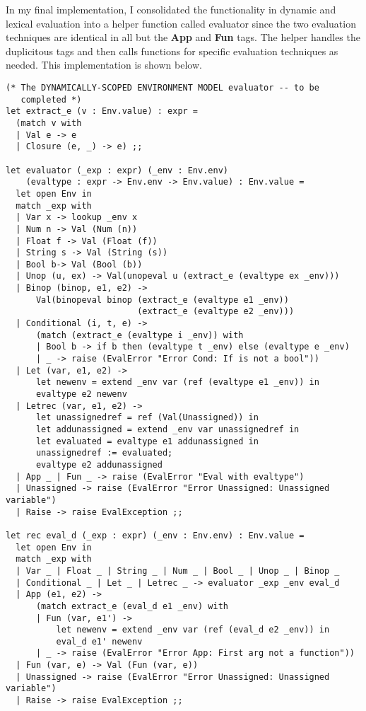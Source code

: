 \documentclass[12pt]{article}
\theoremstyle{definition}
\begin{document}
In my final implementation, I consolidated the functionality in dynamic and lexical evaluation into a helper function called evaluator since the two evaluation techniques are identical in all but the \textbf{App} and \textbf{Fun} tags. The helper handles the duplicitous tags and then calls functions for specific evaluation techniques as needed. This implementation is shown below. 


\begin{verbatim}
(* The DYNAMICALLY-SCOPED ENVIRONMENT MODEL evaluator -- to be
   completed *)
let extract_e (v : Env.value) : expr = 
  (match v with 
  | Val e -> e 
  | Closure (e, _) -> e) ;;

let evaluator (_exp : expr) (_env : Env.env) 
    (evaltype : expr -> Env.env -> Env.value) : Env.value =
  let open Env in 
  match _exp with 
  | Var x -> lookup _env x
  | Num n -> Val (Num (n))
  | Float f -> Val (Float (f))
  | String s -> Val (String (s))
  | Bool b-> Val (Bool (b))
  | Unop (u, ex) -> Val(unopeval u (extract_e (evaltype ex _env)))
  | Binop (binop, e1, e2) -> 
      Val(binopeval binop (extract_e (evaltype e1 _env)) 
                          (extract_e (evaltype e2 _env)))
  | Conditional (i, t, e) -> 
      (match (extract_e (evaltype i _env)) with
      | Bool b -> if b then (evaltype t _env) else (evaltype e _env)
      | _ -> raise (EvalError "Error Cond: If is not a bool"))
  | Let (var, e1, e2) -> 
      let newenv = extend _env var (ref (evaltype e1 _env)) in 
      evaltype e2 newenv
  | Letrec (var, e1, e2) -> 
      let unassignedref = ref (Val(Unassigned)) in 
      let addunassigned = extend _env var unassignedref in 
      let evaluated = evaltype e1 addunassigned in 
      unassignedref := evaluated; 
      evaltype e2 addunassigned
  | App _ | Fun _ -> raise (EvalError "Eval with evaltype")
  | Unassigned -> raise (EvalError "Error Unassigned: Unassigned variable")
  | Raise -> raise EvalException ;;

let rec eval_d (_exp : expr) (_env : Env.env) : Env.value =
  let open Env in 
  match _exp with 
  | Var _ | Float _ | String _ | Num _ | Bool _ | Unop _ | Binop _ 
  | Conditional _ | Let _ | Letrec _ -> evaluator _exp _env eval_d
  | App (e1, e2) -> 
      (match extract_e (eval_d e1 _env) with 
      | Fun (var, e1') -> 
          let newenv = extend _env var (ref (eval_d e2 _env)) in
          eval_d e1' newenv 
      | _ -> raise (EvalError "Error App: First arg not a function"))
  | Fun (var, e) -> Val (Fun (var, e))
  | Unassigned -> raise (EvalError "Error Unassigned: Unassigned variable")
  | Raise -> raise EvalException ;;


\end{verbatim}
\end{document}
